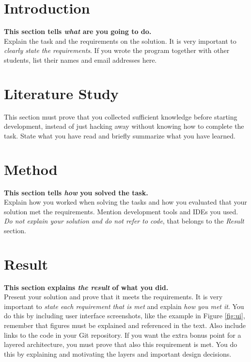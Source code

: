 \documentclass[a4paper]{scrartcl}
\begin{document}
\section{Introduction}

\textbf{This section tells \textit{what} are you going to do.} \\

\noindent Explain the task and the requirements on the solution. It is very important to \textit{clearly state the requirements}. If you wrote the program together with other students, list their names and email addresses here.

\section{Literature Study}

This section must prove that you collected sufficient knowledge before starting development, instead of just hacking away without knowing how to complete the task. State what you have read and briefly summarize what you have learned.

\section{Method}

\textbf{This section tells \textit{how} you solved the task.} \\

\noindent Explain how you worked when solving the tasks and how you evaluated that your solution met the requirements. Mention development tools and IDEs you used. \textit{Do not explain your solution and do not refer to code}, that belongs to the \textit{Result} section.

\section{Result}

\textbf{This section explains \textit{the result} of what you did.} \\

\noindent Present your solution and prove that it meets the requirements. It is very important to \textit{state each requirement that is met} and explain \textit{how you met it}. You do this by including user interface screenshots, like the example in Figure \ref{fig:ui}, remember that figures must be explained and referenced in the text. Also include links to the code in your Git repository.  If you want the extra bonus point for a layered architecture, you must prove that also this requirement is met. You do this by explaining and motivating the layers and important design decisions.
\end{document}
